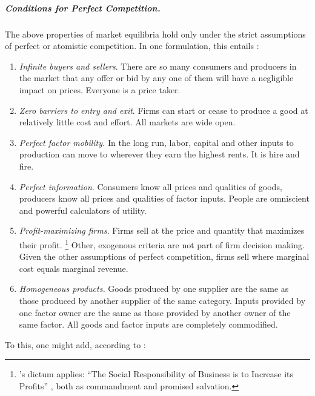\subparagraph[Perfect Competition]{Conditions for Perfect Competition.}  \label{sec:perfect-competition}
The above properties of market equilibria hold only under the strict assumptions of perfect or atomistic competition.
In one formulation, this entails \citep[157f]{McDowell2006}:
\begin{enumerate}
	\item \emph{Infinite buyers and sellers}.\label{it:infinite-buyers-sellers}
	There are so many consumers and producers in the market that any offer or bid by any one of them will have a negligible impact on prices.
	Everyone is a price taker.
	\item \emph{Zero barriers to entry and exit}. \label{it:easy-entry-exit}
		Firms can start or cease to produce a good at relatively little cost and effort.
		All markets are wide open.
	\item \emph{Perfect factor mobility.} \label{it:perfect-factor-mobility}
		In the long run, labor, capital and other inputs to production can move to wherever they earn the highest rents.
		It is hire and fire.
	\item \emph{Perfect information}. \label{it:perfect-information}
		Consumers know all prices and qualities of goods, producers know all prices and qualities of factor inputs.
		People are omniscient and powerful calculators of utility.
	\item \emph{Profit-maximizing firms}. \label{it:profit-maximizing-firms}
		Firms sell at the price and quantity that maximizes their profit.
		\footnote{
			\citeauthor{Friedman1970a}'s dictum applies: ``The Social Responsibility of Business is to Increase its Profits'' \citeyearpar{Friedman1970a}, both as commandment and promised salvation.
		}
		Other, exogenous criteria are not part of firm decision making.
		Given the other assumptions of perfect competition, firms sell where marginal cost equals marginal revenue.
	\item \emph{Homogeneous products.}\label{it:homogeneous-products}
		Goods produced by one supplier are the same as those produced by another supplier of the same category.
		Inputs provided by one factor owner are the same as those provided by another owner of the same factor.
		All goods and factor inputs are completely commodified.
\end{enumerate}
To this, one might add, according to \citeauthor{Wikipedia2012}:
